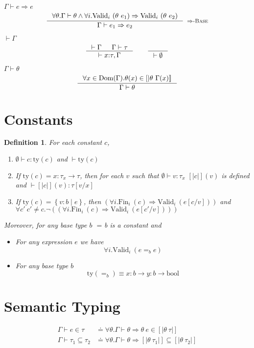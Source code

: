 \documentclass[10pt,a4paper]{article}
\newtheorem{definition}{Definition}
\newcommand\rulename[1]{\textsc{#1}\xspace}
\newcommand\rimpl{\ensuremath{\Rightarrow}\rulename{-Base}}
\newcommand\tbool{\ensuremath{\text{bool}}}
\newcommand\tref[3]{\ensuremath{\left\lbrace {#1} \colon {#2} \mid {#3} \right\rbrace}}
\newcommand\tfun[3]{\ensuremath{#1\colon #2 \rightarrow #3}}
\newcommand\eqb[1]{\ensuremath{=_{#1}}}
\newcommand\eq{\eqb{}}
\newcommand\validi[1]{\ensuremath{\text{Valid}_{i}\ (#1)}}
\newcommand\fini[1]{\ensuremath{\text{Fin}_{i}\ (#1)}}
\newcommand\generalconditionInterp[2]
	{\ensuremath{(\forall i. \fini{#1} \Rightarrow \validi{#2})}}
\newcommand\generalconditionImpl[2]
	{\ensuremath{\forall i . \validi{#1} \Rightarrow \validi{#2}}}
\newcommand\generalconditionImplOne[1]
	{\ensuremath{\forall i . \validi{#1}}}
\newcommand\ty[1]{\ensuremath{\text{ty}({#1})}}
\newcommand\sub[2]{\ensuremath{\left[ #2 / #1 \right]}}
\newcommand\interp[1]{\ensuremath{[|#1|]}}
\newcommand\hastype[3]{\ensuremath{#1 \vdash #2 \colon #3}}
\newcommand\shastype[3]{\ensuremath{#1 \vdash #2 \in #3}}
\newcommand\iswellformed[2]{\ensuremath{#1 \vdash #2}}
\newcommand\sissubtype[3]{\ensuremath{#1 \vdash #2 \subseteq #3}}
\newcommand\issubref[3]{\ensuremath{#1 \vdash #2 \Rightarrow #3}}
\begin{document}
\hfill\mbox{\issubref{\Gamma}{e}{e}}
$$
\inference{
	\forall \theta. \iswellformed{\Gamma}{\theta} \land
	\generalconditionImpl{\theta\ e_1}{\theta\ e_2}
}{
	\issubref{\Gamma}{e_1}{e_2}
}[\rimpl]
$$

\hfill\mbox{\iswellformed{}{\Gamma}}
$$
\inference{
	\iswellformed{}{\Gamma} &&
	\iswellformed{\Gamma}{\tau}
}{
	\iswellformed{}{x\colon\tau,\Gamma}
}
\qquad
\inference{}{\iswellformed{}{\emptyset}}
$$


\hfill\mbox{\iswellformed{\Gamma}{\theta}}
$$
\inference{
	\forall x \in \text{Dom}(\Gamma). 
	\theta(x) \in \interp{\theta \ \Gamma(x)}
}{
	\iswellformed{\Gamma}{\theta}
}
$$


\section*{Constants}
\begin{definition}\label{def:constants}
For each constant $c$, 
\begin{enumerate}
\item \hastype{\emptyset}{c}{\ty{c}} and \iswellformed{}{\ty{c}}
\item If $\ty{c} = \tfun{x}{\tau_x}{\tau}$, then for each $v$ such that
\hastype{\emptyset}{v}{\tau_x} $\interp{c}(v)$ is defined and
\hastype{}{\interp{c}(v)}{\tau\sub{x}{v}}
\item If $\ty{c} = \tref{v}{b}{e}$, 
then \generalconditionInterp{c}{e\sub{v}{c}} and 
$\forall c'\ c' \neq c. \lnot (\generalconditionInterp{c}{e\sub{v}{c'}})$ 
\end{enumerate}
Moreover, for any base type $b$ \eq{b} is a constant and 
\begin{itemize}
\item For any expression $e$ we have 
$$\generalconditionImplOne{e \eqb{b} e}$$
\item For any base type $b$ 
$$\ty{=_b} \equiv \tfun{x}{b}{\tfun{y}{b}{\tbool}}$$
\end{itemize}
\end{definition}

\section*{Semantic Typing}
\begin{align*}
\shastype{\Gamma}{e}{\tau} & \doteq
	\forall \theta . \iswellformed{\Gamma}{\theta} \Rightarrow \theta\ e \in \interp{\theta \ \tau}\\
\sissubtype{\Gamma}{\tau_1}{\tau_2} & \doteq 
	\forall \theta . \iswellformed{\Gamma}{\theta} \Rightarrow \interp{\theta\ \tau_1} \subseteq \interp{\theta\ \tau_2}
\end{align*}
\end{document}
